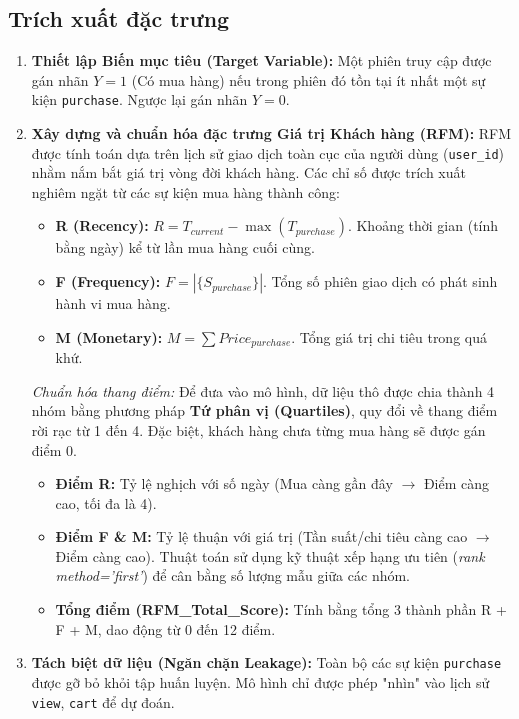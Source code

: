 \documentclass[a4paper,11pt]{article}
\begin{document}
\subsection{Trích xuất đặc trưng}
\begin{enumerate}[itemsep=4pt, leftmargin=*]
    \item \textbf{Thiết lập Biến mục tiêu (Target Variable):} Một phiên truy cập được gán nhãn $Y = 1$ (Có mua hàng) nếu trong phiên đó tồn tại ít nhất một sự kiện \texttt{purchase}. Ngược lại gán nhãn $Y = 0$.
   \item \textbf{Xây dựng và chuẩn hóa đặc trưng Giá trị Khách hàng (RFM):} RFM được tính toán dựa trên lịch sử giao dịch toàn cục của người dùng (\texttt{user\_id}) nhằm nắm bắt giá trị vòng đời khách hàng. Các chỉ số được trích xuất nghiêm ngặt từ các sự kiện mua hàng thành công:
    \begin{itemize}
        \item \textbf{R (Recency):} $R = T_{current} - \max(T_{purchase})$. Khoảng thời gian (tính bằng ngày) kể từ lần mua hàng cuối cùng.
        \item \textbf{F (Frequency):} $F = |\{S_{purchase}\}|$. Tổng số phiên giao dịch có phát sinh hành vi mua hàng.
        \item \textbf{M (Monetary):} $M = \sum Price_{purchase}$. Tổng giá trị chi tiêu trong quá khứ.
    \end{itemize}
    \textit{Chuẩn hóa thang điểm:} Để đưa vào mô hình, dữ liệu thô được chia thành 4 nhóm bằng phương pháp \textbf{Tứ phân vị (Quartiles)}, quy đổi về thang điểm rời rạc từ 1 đến 4. Đặc biệt, khách hàng chưa từng mua hàng sẽ được gán điểm 0.
    \begin{itemize}
        \item \textbf{Điểm R:} Tỷ lệ nghịch với số ngày (Mua càng gần đây $\rightarrow$ Điểm càng cao, tối đa là 4).
        \item \textbf{Điểm F \& M:} Tỷ lệ thuận với giá trị (Tần suất/chi tiêu càng cao $\rightarrow$ Điểm càng cao). Thuật toán sử dụng kỹ thuật xếp hạng ưu tiên (\textit{rank method='first'}) để cân bằng số lượng mẫu giữa các nhóm.
        \item \textbf{Tổng điểm (RFM\_Total\_Score):} Tính bằng tổng 3 thành phần R + F + M, dao động từ 0 đến 12 điểm.
    \end{itemize}
    \item \textbf{Tách biệt dữ liệu (Ngăn chặn Leakage):} Toàn bộ các sự kiện \texttt{purchase} được gỡ bỏ khỏi tập huấn luyện. Mô hình chỉ được phép "nhìn" vào lịch sử \texttt{view}, \texttt{cart} để dự đoán.

\end{enumerate}
\end{document}
